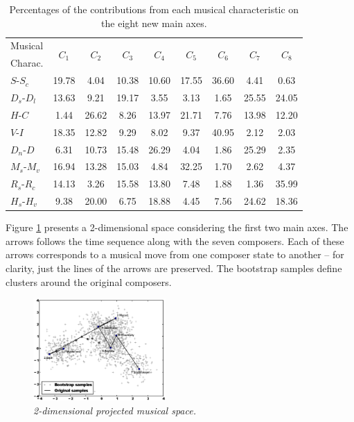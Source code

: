 \documentclass[
 aip,
 jmp,
 amsmath,amssymb,
 reprint,
]{revtex4-1}
\begin{document}
\begin{table}[ht]
\caption{\label{tab:Deviates}Percentages of
the contributions from each musical characteristic on the eight
new main axes.}

\begin{tabular}{|l||c|c|c|c|c|c|c|c|}
\hline
Musical         & \multirow{2}{*}{$C_1$} & \multirow{2}{*}{$C_2$} & \multirow{2}{*}{$C_3$} & \multirow{2}{*}{$C_4$} & \multirow{2}{*}{$C_5$} & \multirow{2}{*}{$C_6$} & \multirow{2}{*}{$C_7$} & \multirow{2}{*}{$C_8$}\\
Charac. & & & & & & & & \\
\hline
 $S$-$S_c$              &  19.78  &   4.04  & 10.38 & 10.60 &  17.55  &  36.60  &  4.41 &  0.63 \\
 $D_s$-$D_l$            &  13.63  &   9.21  & 19.17 &  3.55 &   3.13  &   1.65  & 25.55 & 24.05 \\
 $H$-$C$                &   1.44  &  26.62  & 8.26 & 13.97 &  21.71  &   7.76  & 13.98 & 12.20 \\
 $V$-$I$                &  18.35  &  12.82  & 9.29 &  8.02 &   9.37  &  40.95  &  2.12 &  2.03 \\
 $D_n$-$D$              &   6.31  &  10.73  & 15.48 & 26.29 &  4.04  &   1.86  & 25.29 &  2.35 \\
 $M_s$-$M_v$            &  16.94  &  13.28  & 15.03 &  4.84 &  32.25  &  1.70  &  2.62 &  4.37 \\
 $R_s$-$R_c$            &  14.13  &   3.26  & 15.58 & 13.80 &   7.48  &  1.88  &  1.36 & 35.99 \\
 $H_s$-$H_v$            &   9.38  &  20.00  &  6.75 & 18.88 &   4.45  &  7.56  & 24.62 & 18.36 \\
\hline
\end{tabular}
\end{table}

Figure \ref{fig:pca} presents a 2-dimensional space considering the
first two main axes. The arrows follows the time sequence along with the seven
composers. Each of these arrows corresponds to a musical move from one
composer state to another -- for clarity, just the lines of the arrows
are preserved. The bootstrap
samples define clusters around the original
composers.

\begin{figure}[htbp]
  \begin{center}
    \includegraphics[width=0.45\textwidth]{g1}
  \end{center}
  \caption{\it 2-dimensional projected musical space.}
  \label{fig:pca}
\end{figure}
\end{document}
